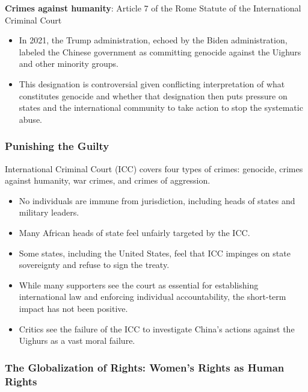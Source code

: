 \documentclass[
]{book}
\begin{document}
\textbf{Crimes against humanity}: Article 7 of the Rome Statute of the International Criminal Court

\begin{itemize}
\item
  In 2021, the Trump administration, echoed by the Biden administration, labeled the Chinese government as committing genocide against the Uighurs and other minority groups.
\item
  This designation is controversial given conflicting interpretation of what constitutes genocide and whether that designation then puts pressure on states and the international community to take action to stop the systematic abuse.
\end{itemize}

\hypertarget{punishing-the-guilty}{%
\subsubsection{Punishing the Guilty}\label{punishing-the-guilty}}

International Criminal Court (ICC) covers four types of crimes: genocide, crimes against humanity, war crimes, and crimes of aggression.

\begin{itemize}
\item
  No individuals are immune from jurisdiction, including heads of states and military leaders.
\item
  Many African heads of state feel unfairly targeted by the ICC.
\item
  Some states, including the United States, feel that ICC impinges on state sovereignty and refuse to sign the treaty.
\item
  While many supporters see the court as essential for establishing international law and enforcing individual accountability, the short-term impact has not been positive.
\item
  Critics see the failure of the ICC to investigate China's actions against the Uighurs as a vast moral failure.
\end{itemize}

\hypertarget{the-globalization-of-rights-womens-rights-as-human-rights}{%
\subsubsection{The Globalization of Rights: Women's Rights as Human Rights}\label{the-globalization-of-rights-womens-rights-as-human-rights}}
\end{document}
